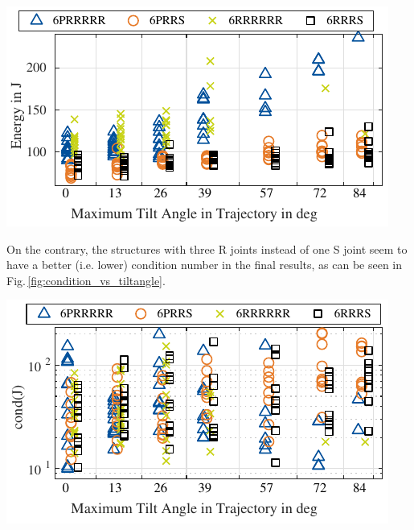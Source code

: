\documentclass[fleqn,a4paper,10pt]{article}
\renewenvironment{figure}
  {\par\vspace{6pt}\noindent\minipage{\linewidth}}
  {\endminipage\par\vspace{6pt}}
\begin{document}
\begin{multicols}{2}
\begin{figure}
\centering
\includegraphics{./Bilder/figure_energy_vs_tiltangle.pdf}
\vspace{-0.4cm} %
\label{fig:energy_vs_tiltangle}
\end{figure}

On the contrary, the structures with three R joints instead of one S joint seem to have a better (i.e. lower) condition number in the final results, as can be seen in Fig.\,\ref{fig:condition_vs_tiltangle}.

\begin{figure}
\centering
\includegraphics{./Bilder/figure_condition_vs_tiltangle.pdf}
\vspace{-0.4cm} %
\label{fig:condition_vs_tiltangle}
\end{figure}




\end{multicols}
\end{document}
